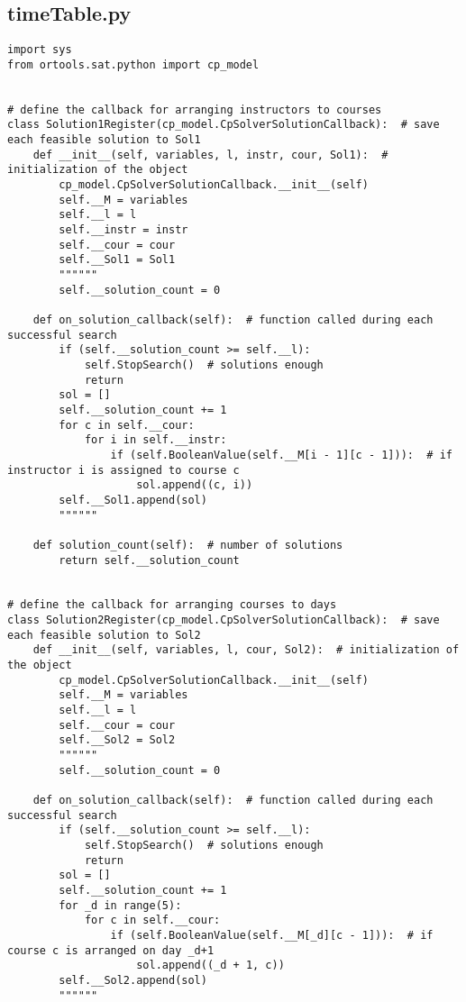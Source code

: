 \documentclass{article}
\begin{document}
\subsection*{timeTable.py}
\begin{verbatim}
import sys
from ortools.sat.python import cp_model


# define the callback for arranging instructors to courses
class Solution1Register(cp_model.CpSolverSolutionCallback):  # save each feasible solution to Sol1
    def __init__(self, variables, l, instr, cour, Sol1):  # initialization of the object
        cp_model.CpSolverSolutionCallback.__init__(self)
        self.__M = variables
        self.__l = l
        self.__instr = instr
        self.__cour = cour
        self.__Sol1 = Sol1
        """"""
        self.__solution_count = 0

    def on_solution_callback(self):  # function called during each successful search
        if (self.__solution_count >= self.__l):
            self.StopSearch()  # solutions enough
            return
        sol = []
        self.__solution_count += 1
        for c in self.__cour:
            for i in self.__instr:
                if (self.BooleanValue(self.__M[i - 1][c - 1])):  # if instructor i is assigned to course c
                    sol.append((c, i))
        self.__Sol1.append(sol)
        """"""

    def solution_count(self):  # number of solutions
        return self.__solution_count


# define the callback for arranging courses to days
class Solution2Register(cp_model.CpSolverSolutionCallback):  # save each feasible solution to Sol2
    def __init__(self, variables, l, cour, Sol2):  # initialization of the object
        cp_model.CpSolverSolutionCallback.__init__(self)
        self.__M = variables
        self.__l = l
        self.__cour = cour
        self.__Sol2 = Sol2
        """"""
        self.__solution_count = 0

    def on_solution_callback(self):  # function called during each successful search
        if (self.__solution_count >= self.__l):
            self.StopSearch()  # solutions enough
            return
        sol = []
        self.__solution_count += 1
        for _d in range(5):
            for c in self.__cour:
                if (self.BooleanValue(self.__M[_d][c - 1])):  # if course c is arranged on day _d+1
                    sol.append((_d + 1, c))
        self.__Sol2.append(sol)
        """"""


\end{verbatim}
\end{document}
